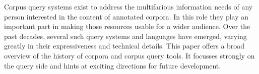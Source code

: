Corpus query systems exist to address the multifarious information needs of any person interested in the content of annotated corpora. In this role they play an important part in making those resources usable for a wider audience. Over the past decades, several such query systems and languages have emerged, varying greatly in their expressiveness and technical details. This paper offers a broad overview of the history of corpora and corpus query tools. It focusses strongly on the query side and hints at exciting directions for future development.

